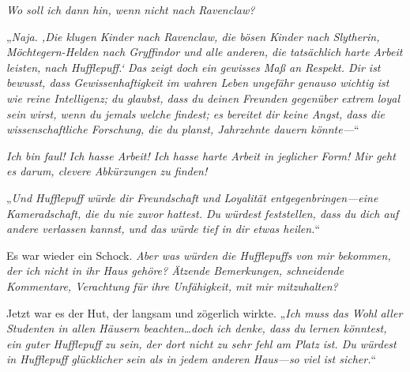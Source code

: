 \emph{Wo soll ich dann hin, wenn nicht nach Ravenclaw? }

„\emph{Naja. ‚Die klugen Kinder nach Ravenclaw, die bösen Kinder nach Slytherin, Möchtegern-Helden nach Gryffindor und alle anderen, die tatsächlich harte Arbeit leisten, nach Hufflepuff.‘ Das zeigt doch ein gewisses Maß an Respekt. Dir ist bewusst, dass Gewissenhaftigkeit im wahren Leben ungefähr genauso wichtig ist wie reine Intelligenz; du glaubst, dass du deinen Freunden gegenüber extrem loyal sein wirst, wenn du jemals welche findest; es bereitet dir keine Angst, dass die wissenschaftliche Forschung, die du planst, Jahrzehnte dauern könnte—}“

\emph{Ich bin faul! Ich hasse Arbeit! Ich hasse harte Arbeit in jeglicher Form! Mir geht es darum, clevere Abkürzungen zu finden! }

„\emph{Und Hufflepuff würde dir Freundschaft und Loyalität entgegenbringen—eine Kameradschaft, die du nie zuvor hattest. Du würdest feststellen, dass du dich auf andere verlassen kannst, und das würde tief in dir etwas heilen.}“

Es war wieder ein Schock. \emph{Aber was würden die Hufflepuffs von \emph{mir} bekommen, der ich nicht in ihr Haus gehöre? Ätzende Bemerkungen, schneidende Kommentare, Verachtung für ihre Unfähigkeit, mit mir mitzuhalten?}

Jetzt war es der Hut, der langsam und zögerlich wirkte. „\emph{Ich muss das Wohl aller Studenten in allen Häusern beachten…doch ich denke, dass du lernen könntest, ein guter Hufflepuff zu sein, der dort nicht zu sehr fehl am Platz ist. Du würdest in Hufflepuff glücklicher sein als in jedem anderen Haus—so viel ist sicher.}“

